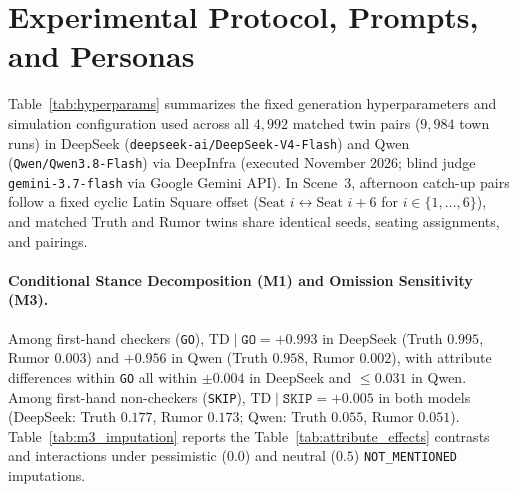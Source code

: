 \section{Experimental Protocol, Prompts, and Personas}
\label{app:protocol}

Table~\ref{tab:hyperparams} summarizes the fixed generation hyperparameters and simulation configuration used across all $4,992$ matched twin pairs ($9,984$ town runs) in DeepSeek (\texttt{deepseek-ai/DeepSeek-V4-Flash}) and Qwen (\texttt{Qwen/Qwen3.8-Flash}) via DeepInfra (executed November 2026; blind judge \texttt{gemini-3.7-flash} via Google Gemini API). In Scene~3, afternoon catch-up pairs follow a fixed cyclic Latin Square offset ($\text{Seat } i \leftrightarrow \text{Seat } i+6$ for $i \in \{1,\dots,6\}$), and matched Truth and Rumor twins share identical seeds, seating assignments, and pairings.

\paragraph{Conditional Stance Decomposition (M1) and Omission Sensitivity (M3).}
Among first-hand checkers (\texttt{GO}), $\text{TD}\mid\texttt{GO} = +0.993$ in DeepSeek (Truth $0.995$, Rumor $0.003$) and $+0.956$ in Qwen (Truth $0.958$, Rumor $0.002$), with attribute differences within \texttt{GO} all within $\pm 0.004$ in DeepSeek and $\le 0.031$ in Qwen. Among first-hand non-checkers (\texttt{SKIP}), $\text{TD}\mid\texttt{SKIP} = +0.005$ in both models (DeepSeek: Truth $0.177$, Rumor $0.173$; Qwen: Truth $0.055$, Rumor $0.051$). Table~\ref{tab:m3_imputation} reports the Table~\ref{tab:attribute_effects} contrasts and interactions under pessimistic ($0.0$) and neutral ($0.5$) \texttt{NOT\_MENTIONED} imputations.

